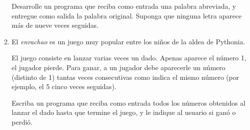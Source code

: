 \documentclass[11pt,spanish,dvipsnames]{article}
\newcommand{\pond}[1]{[{\small\textbf{#1\%}}]}
\begin{document}
\begin{enumerate}[font=\Large\bfseries]
      Desarrolle un programa
      que reciba como entrada una palabra abreviada,
      y entregue como salida la palabra original.
      Suponga que ninguna letra
      aparece más de nueve veces seguidas.

    \newpage
    \item
      \pond{25}
      El \emph{enrachao} es un juego muy popular
      entre los niños de la aldea de Pythonia.

      El juego consiste en lanzar varias veces un dado.
      Apenas aparece el número 1, el jugador pierde.
      Para ganar, a un jugador debe aparecerle un número
      (distinto de 1)
      tantas veces consecutivas como indica el mismo número
      (por ejemplo, el 5 cinco veces seguidas).

      Escriba un programa que reciba como entrada
      todos los números obtenidos al lanzar el dado
      hasta que termine el juego,
      y le indique al usuario si ganó o perdió.

      \begin{minipage}[t]{.26\textwidth}
        
      \end{minipage}
      \hspace{1em}
      \begin{minipage}[t]{.26\textwidth}
        
      \end{minipage}

  \end{enumerate}
\end{document}
